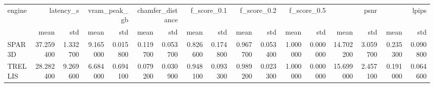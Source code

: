 \begin{tabular}{lrrrrrrrrrrrrrrrr}
\toprule
engine & \multicolumn{2}{r}{latency_s} & \multicolumn{2}{r}{vram_peak_gb} & \multicolumn{2}{r}{chamfer_distance} & \multicolumn{2}{r}{f_score_0.1} & \multicolumn{2}{r}{f_score_0.2} & \multicolumn{2}{r}{f_score_0.5} & \multicolumn{2}{r}{psnr} & \multicolumn{2}{r}{lpips} \\
 & mean & std & mean & std & mean & std & mean & std & mean & std & mean & std & mean & std & mean & std \\
\midrule
SPAR3D & 37.259400 & 1.332700 & 9.165000 & 0.015800 & 0.119700 & 0.053700 & 0.826600 & 0.174800 & 0.967700 & 0.053400 & 1.000000 & 0.000000 & 14.702200 & 3.059700 & 0.235300 & 0.090800 \\
TRELLIS & 28.282400 & 9.269600 & 6.684000 & 0.694100 & 0.079200 & 0.030900 & 0.948100 & 0.093300 & 0.989200 & 0.023300 & 1.000000 & 0.000000 & 15.699000 & 2.457100 & 0.191000 & 0.064600 \\
\bottomrule
\end{tabular}
